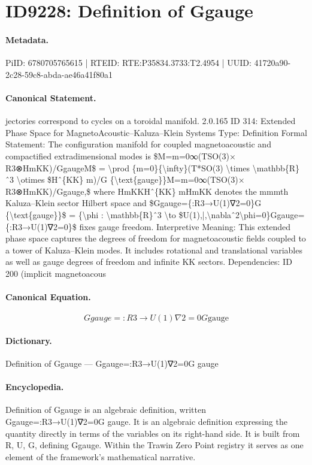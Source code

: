 \section*{ID9228: Definition of Ggauge}
\paragraph{Metadata.}
PiID: 6780705765615 | RTEID: RTE:P35834.3733:T2.4954 | UUID: 41720a90-2c28-59c8-abda-ae46a41f80a1

\paragraph{Canonical Statement.}
jectories correspond to cycles on a toroidal manifold. 2.0.165 ID 314: Extended Phase Space for MagnetoAcoustic–Kaluza–Klein Systems Type: Definition Formal Statement: The configuration manifold for coupled magnetoacoustic and compactified extradimensional modes is \$M=m=0∞(TSO(3)× R3⊗HmKK)/GgaugeM\$ = \textbackslash{}prod \{m=0\}\{\textbackslash{}infty\}(T*SO(3) \textbackslash{}times \textbackslash{}mathbb\{R\}ˆ3 \textbackslash{}otimes \$Hˆ\{KK\} m)/G \{\textbackslash{}text\{gauge\}\}M=m=0∞(TSO(3)× R3⊗HmKK)/Ggauge,\$ where HmKKHˆ\{KK\} mHmKK denotes the mmmth Kaluza–Klein sector Hilbert space and \$Ggauge=\{:R3→U(1)∇2=0\}G \{\textbackslash{}text\{gauge\}\}\$ = \{\textbackslash{}phi : \textbackslash{}mathbb\{R\}ˆ3 \textbackslash{}to \$U(1),|,\textbackslash{}nablaˆ2\textbackslash{}phi=0\}Ggauge=\{:R3→U(1)∇2=0\}\$ fixes gauge freedom. Interpretive Meaning: This extended phase space captures the degrees of freedom for magnetoacoustic fields coupled to a tower of Kaluza–Klein modes. It includes rotational and translational variables as well as gauge degrees of freedom and infinite KK sectors. Dependencies: ID 200 (implicit magnetoacous

\paragraph{Canonical Equation.}
\[
Ggauge={:R3→U(1)∇2=0}G {\text{gauge}}
\]

\paragraph{Dictionary.}
Definition of Ggauge — Ggauge=:R3→U(1)∇2=0G gauge

\paragraph{Encyclopedia.}
Definition of Ggauge is an algebraic definition, written Ggauge=:R3→U(1)∇2=0G gauge. It is an algebraic definition expressing the quantity directly in terms of the variables on its right-hand side. It is built from R, U, G, defining Ggauge. Within the Trawin Zero Point registry it serves as one element of the framework's mathematical narrative.
